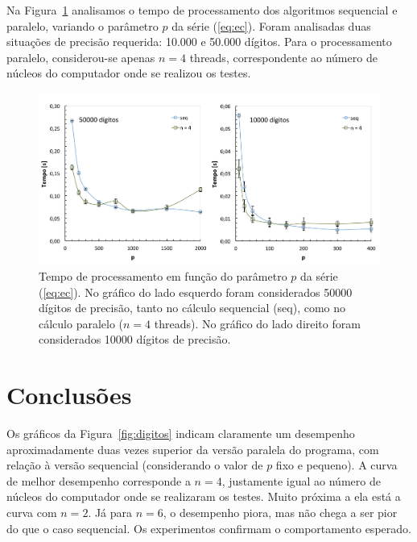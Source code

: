 \documentclass[12pt]{article}
\begin{document}
Na Figura~\ref{fig:p} analisamos o tempo de processamento dos algoritmos sequencial e paralelo, 
variando o parâmetro $p$ da série (\ref{eq:ec}). Foram analisadas duas situações de precisão 
requerida: 10.000 e 50.000 dígitos. Para o processamento paralelo, considerou-se apenas $n = 4$ 
threads, correspondente ao número de núcleos do computador onde se realizou os testes.
%
\begin{figure}[ht]
	\begin{center}
		\includegraphics[scale=0.5]{p.pdf}
		\caption{Tempo de processamento em função do parâmetro $p$ da série (\ref{eq:ec}). No gráfico do 
		lado esquerdo foram considerados 50000 dígitos de precisão, tanto no cálculo sequencial (seq), 
		como no cálculo paralelo ($n = 4$ threads). No gráfico do lado direito foram considerados 10000 
		dígitos de precisão.}
		\label{fig:p} 
	\end{center}
\end{figure}


\section{Conclusões}

Os gráficos da Figura~\ref{fig:digitos} indicam claramente um desempenho aproximadamente duas vezes 
superior da versão paralela do programa, com relação à versão sequencial (considerando o valor de 
$p$ fixo e pequeno). A curva de melhor desempenho corresponde a $n = 4$, justamente igual ao número 
de núcleos do computador onde se realizaram os testes. Muito próxima a ela está a curva com $n = 2$. 
Já para $n = 6$, o desempenho piora, mas não chega a ser pior do que o caso sequencial. Os 
experimentos confirmam o comportamento esperado. 
\end{document}
